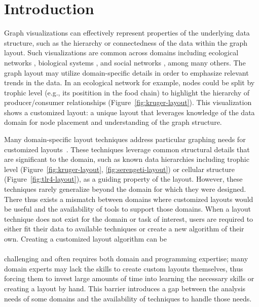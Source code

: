 \section{Introduction}
Graph visualizations can effectively represent properties of the underlying
data structure, such as the hierarchy or connectedness of the data within
the graph layout. Such visualizations are common across domains including
ecological networks
\cite{hinke2004visualizing,harper2006dynamic,lavigne1996cod,baskerville2011spatial,yodzis1998local,cohen2003ecological,kearney2016blog,benson2016higher},
biological systems
\cite{barsky2008cerebral,shannon2003cytoscape,gehlenborg2010visualization,saraiya2005visualizing,becker2001graph},
and social networks \cite{rothenberg1998using} , among many others. The graph layout may utilize
domain-specific details in order to emphasize relevant trends in the
data. In an ecological network for example, nodes could be split by trophic
level (e.g., its positition in the food chain) to highlight the hierarchy
of producer/consumer relationships
(Figure~\ref{fig:kruger-layout}). This visualization shows a customized
layout: a unique layout that leverages knowledge of the data domain for
node placement and understanding of the graph structure.

Many domain-specific layout techniques address particular graphing needs
for customized layouts~\cite{barsky2008cerebral,shannon2003cytoscape,kearney2017d3,kearney2017ecopath}. These
techniques leverage common structural details that are significant to the
domain, such as known data hierarchies including trophic level
(Figure~\ref{fig:kruger-layout}, \ref{fig:serengeti-layout}) or cellular 
structure (Figure~\ref{fig:tlr4-layout}), as a guiding property of the
layout. However, these techniques rarely generalize beyond the domain for
which they were designed. There thus exists a mismatch between domains
where customized layouts would be useful and the availability of tools to
support those domains. When a layout technique does not exist for the
domain or task of interest, users are required to either fit their data
to available techniques or create a new algorithm of their own. Creating a
customized layout algorithm can be\linebreak \krugerLayout \\ \\ 
challenging and often requires both
domain and programming expertise; many domain
experts may lack the skills to create custom layouts themselves, thus
forcing them to invest large amounts of time into learning the necessary
skills or creating a layout by hand. This barrier introduces a gap between
the analysis needs of some domains and the availability of techniques to
handle those needs.

